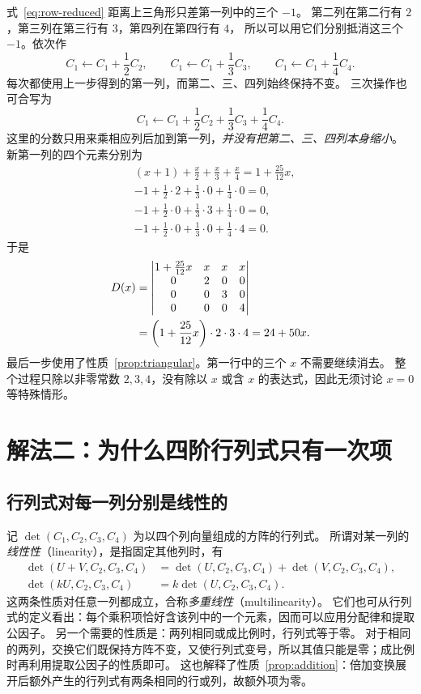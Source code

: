 \documentclass[UTF8,12pt,a4paper,fontset=fandol]{ctexart}
\begin{document}
式~\eqref{eq:row-reduced} 距离上三角形只差第一列中的三个 $-1$。
第二列在第二行有 $2$，第三列在第三行有 $3$，第四列在第四行有 $4$，
所以可以用它们分别抵消这三个 $-1$。依次作
\[
  C_1\leftarrow C_1+\frac12C_2,\qquad
  C_1\leftarrow C_1+\frac13C_3,\qquad
  C_1\leftarrow C_1+\frac14C_4.
\]
每次都使用上一步得到的第一列，而第二、三、四列始终保持不变。
三次操作也可合写为
\[
  C_1\leftarrow C_1+\frac12C_2+\frac13C_3+\frac14C_4.
\]
这里的分数只用来乘相应列后加到第一列，\emph{并没有把第二、三、四列本身缩小}。
新第一列的四个元素分别为
\begin{align*}
  &(x+1)+\frac{x}{2}+\frac{x}{3}+\frac{x}{4}
    =1+\frac{25}{12}x,\\
  &-1+\frac12\cdot2+\frac13\cdot0+\frac14\cdot0=0,\\
  &-1+\frac12\cdot0+\frac13\cdot3+\frac14\cdot0=0,\\
  &-1+\frac12\cdot0+\frac13\cdot0+\frac14\cdot4=0.
\end{align*}
于是
\begin{align}
  D(x)
  &=\begin{vmatrix}
    1+\frac{25}{12}x&x&x&x\\
    0&2&0&0\\
    0&0&3&0\\
    0&0&0&4
  \end{vmatrix}\notag\\
  &=\left(1+\frac{25}{12}x\right)\cdot2\cdot3\cdot4
    =24+50x.
  \label{eq:triangular-calculation}
\end{align}
最后一步使用了性质~\ref{prop:triangular}。第一行中的三个 $x$ 不需要继续消去。
整个过程只除以非零常数 $2,3,4$，没有除以 $x$ 或含 $x$ 的表达式，因此无须讨论 $x=0$ 等特殊情形。

\section{解法二：为什么四阶行列式只有一次项}
\label{sec:linearity}

\subsection{行列式对每一列分别是线性的}

记 $\det(C_1,C_2,C_3,C_4)$ 为以四个列向量组成的方阵的行列式。
所谓对某一列的\emph{线性性}（linearity），是指固定其他列时，有
\begin{align*}
  \det(U+V,C_2,C_3,C_4)
  &=\det(U,C_2,C_3,C_4)+\det(V,C_2,C_3,C_4),\\
  \det(kU,C_2,C_3,C_4)
  &=k\det(U,C_2,C_3,C_4).
\end{align*}
这两条性质对任意一列都成立，合称\emph{多重线性}（multilinearity）。
它们也可从行列式的定义看出：每个乘积项恰好含该列中的一个元素，因而可以应用分配律和提取公因子。
另一个需要的性质是：两列相同或成比例时，行列式等于零。
对于相同的两列，交换它们既保持方阵不变，又使行列式变号，所以其值只能是零；成比例时再利用提取公因子的性质即可。
这也解释了性质~\ref{prop:addition}：倍加变换展开后额外产生的行列式有两条相同的行或列，故额外项为零。
\end{document}
